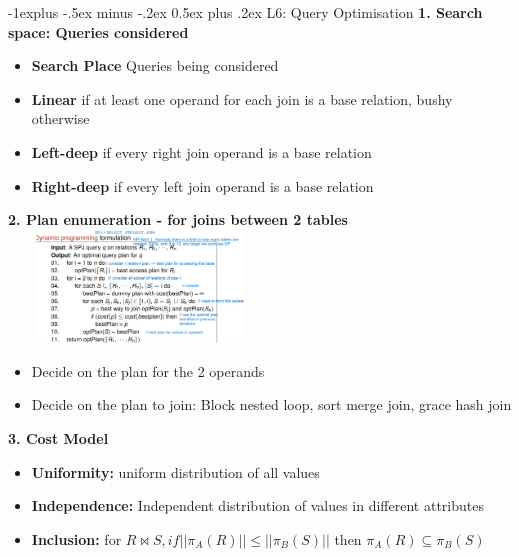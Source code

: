 \documentclass[10pt, landscape]{article}
\makeatletter
\renewcommand{\subsection}{\@startsection{subsection}{2}{0mm}%
                                {-1explus -.5ex minus -.2ex}%
                                {0.5ex plus .2ex}%
                                {\normalfont\normalsize\bfseries}}
\makeatother
\begin{document}
\begin{multicols}{4}
\begin{multicols}{2}
\begin{itemize}
    \end{itemize}
\end{multicols}


\subsection{L6: Query Optimisation}
\textbf{1. Search space: Queries considered} \\ 
\begin{itemize}
  \item \textbf{Search Place} Queries being considered
  \item \textbf{Linear} if at least one operand for each join is a base relation, bushy otherwise
  \item \textbf{Left-deep} if every right join operand is a base relation 
  \item \textbf{Right-deep} if every left join operand is a base relation
\end{itemize}


\textbf{2. Plan enumeration - for joins between 2 tables} \\
\includegraphics[width=7cm, height =3cm]{dp_2.png}

\begin{itemize}
  \item Decide on the plan for the 2 operands 
  \item Decide on the plan to join: Block nested loop, sort merge join, grace hash join
\end{itemize}

\textbf{3. Cost Model} \\
\begin{itemize}
  \item \textbf{Uniformity:} uniform distribution of all values
  \item \textbf{Independence:} Independent distribution of values in different attributes
  \item \textbf{Inclusion:} for $R\bowtie S, if ||\pi_A(R)|| \leq ||\pi_B(S)||$ then $\pi_A(R) \subseteq \pi_B(S)$
\end{itemize}


\end{multicols}
\end{document}
